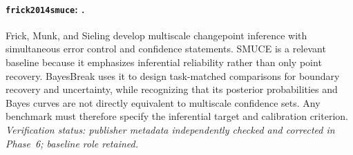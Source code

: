 
\paragraph{\texttt{frick2014smuce}: \citet{frick2014smuce}.}
Frick, Munk, and Sieling develop multiscale changepoint inference with simultaneous error control and confidence statements. SMUCE is a relevant baseline because it emphasizes inferential reliability rather than only point recovery. BayesBreak uses it to design task-matched comparisons for boundary recovery and uncertainty, while recognizing that its posterior probabilities and Bayes curves are not directly equivalent to multiscale confidence sets. Any benchmark must therefore specify the inferential target and calibration criterion. \textit{Verification status: publisher metadata independently checked and corrected in Phase~6; baseline role retained.}
